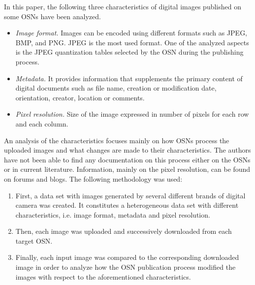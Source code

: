 \documentclass[10pt, conference]{IEEEtran}
\begin{document}
In this paper, the following three characteristics of digital images published on some OSNs have been analyzed. 
\begin{itemize}
\item {\sl Image format.} Images can be encoded using different formats such as JPEG, BMP, and PNG. JPEG is the most used format. One of the analyzed aspects is the JPEG quantization tables selected by the OSN during the publishing  process.
\item {\sl Metadata.} It provides information that supplements the primary content of digital documents such as file name, creation or modification date, orientation, creator, location or comments.
\item {\sl Pixel resolution.} Size of the image expressed in number of pixels for each row and each column.
\end{itemize}


An analysis of the characteristics focuses mainly on how OSNs process the uploaded images and what changes are made to their characteristics.
The authors have not been able to find any documentation on this process either on the OSNs or in current literature. Information, mainly on the pixel resolution, can be found on forums and blogs. 
The following  methodology was used:
\begin{enumerate}
\item First, a data set with images generated by several different brands of digital camera was created. It constitutes a heterogeneous data set with different characteristics, i.e. image format, metadata and pixel resolution.
\item Then, each image was uploaded and successively downloaded from each target OSN.
\item Finally, each input image was compared to the corresponding downloaded image in order to analyze how the OSN publication process modified the images with respect to the aforementioned characteristics.
\end{enumerate}
\end{document}
